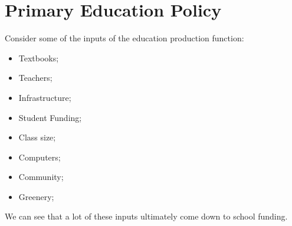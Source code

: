 \documentclass[10pt]{extarticle}
\begin{document}
  \section{Primary Education Policy}%
  Consider some of the inputs of the education production function:
  \begin{itemize}
    \item Textbooks;
    \item Teachers;
    \item Infrastructure;
    \item Student Funding;
    \item Class size;
    \item Computers;
    \item Community;
    \item Greenery;
  \end{itemize}
  We can see that a lot of these inputs ultimately come down to school funding.\\
\end{document}
